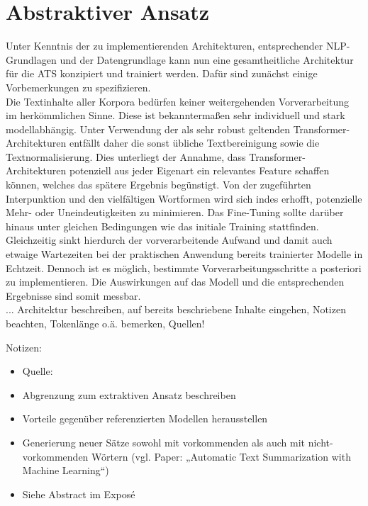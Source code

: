 \chapter{Abstraktiver Ansatz}
\thispagestyle{fancy}
\label{chap:Abstraktiver Ansatz}

\noindent
Unter Kenntnis der zu implementierenden Architekturen, entsprechender \ac{NLP}-Grundlagen und der Datengrundlage kann nun eine gesamtheitliche Architektur für die \ac{ATS} konzipiert und trainiert werden. Dafür sind zunächst einige Vorbemerkungen zu spezifizieren.\\

\noindent
Die Textinhalte aller Korpora bedürfen keiner weitergehenden Vorverarbeitung im herkömmlichen Sinne. Diese ist bekanntermaßen sehr individuell und stark modellabhängig. Unter Verwendung der als sehr robust geltenden Transformer-Architekturen entfällt daher die sonst übliche Textbereinigung sowie die Textnormalisierung. Dies unterliegt der Annahme, dass Transformer-Architekturen potenziell aus jeder Eigenart ein relevantes Feature schaffen können, welches das spätere Ergebnis begünstigt. Von der zugeführten Interpunktion und den vielfältigen Wortformen wird sich indes erhofft, potenzielle Mehr- oder Uneindeutigkeiten zu minimieren. Das Fine-Tuning sollte darüber hinaus unter gleichen Bedingungen wie das initiale Training stattfinden. Gleichzeitig sinkt hierdurch der vorverarbeitende Aufwand und damit auch etwaige Wartezeiten bei der praktischen Anwendung bereits trainierter Modelle in Echtzeit. Dennoch ist es möglich, bestimmte Vorverarbeitungsschritte a posteriori zu implementieren. Die Auswirkungen auf das Modell und die entsprechenden Ergebnisse sind somit messbar.\\

... Architektur beschreiben, auf bereits beschriebene Inhalte eingehen, Notizen beachten, Tokenlänge o.ä. bemerken, Quellen!

Notizen:
\begin{itemize}
	\item Quelle: \cite{NIT19}
	\item Abgrenzung zum extraktiven Ansatz beschreiben
	\item Vorteile gegenüber referenzierten Modellen herausstellen
	\item Generierung neuer Sätze sowohl mit vorkommenden als auch mit nicht-vorkommenden Wörtern (vgl. Paper: „Automatic Text Summarization with Machine Learning“)
	\item Siehe Abstract im Exposé
\end{itemize}


